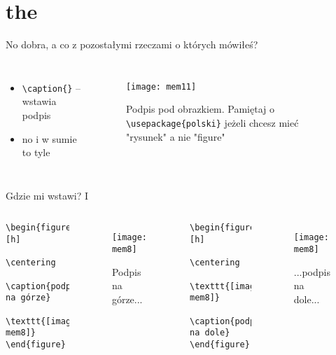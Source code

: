\documentclass{beamer}
\newcommand{\tb}{\textbackslash}
\begin{document}
\section{the}

\begin{frame}{No dobra, a co z pozostałymi rzeczami o których mówiłeś?}{}
\begin{columns}
    \begin{itemize}[<+->]
        \item \texttt{\tb{caption\{\}}} -- wstawia podpis
        \item no i w sumie to tyle
    \end{itemize}
    
\begin{figure}
    \centering
    \texttt{[image: mem11]}
    \caption{Podpis pod obrazkiem. Pamiętaj o \texttt{\tb{}usepackage\{polski\}} jeżeli chcesz mieć "rysunek" a nie "figure"}
    \label{fig:my_label}
\end{figure}
\end{columns}
\end{frame}

\begin{frame}[fragile]{Gdzie mi wstawi? I}

\begin{columns}
    \begin{verbatim}
\begin{figure}[h]
    \centering
    \caption{podpis na górze}
    \texttt{[image: mem8]}
\end{figure}
    \end{verbatim}
    \begin{figure}
        \centering
        \caption{Podpis na górze...}
        \texttt{[image: mem8]}
    \end{figure}
    \begin{verbatim}
\begin{figure}[h]
    \centering
    \texttt{[image: mem8]}
    \caption{podpis na dole}
\end{figure}
    \end{verbatim}
    \begin{figure}
        \centering
        \texttt{[image: mem8]}
        \caption{...podpis na dole...}
    \end{figure}
\end{columns}
\end{frame}
\end{document}
